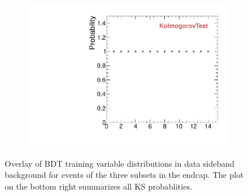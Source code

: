 \begin{figure}
\begin{subfigure}[b]{0.2\textwidth}
                \includegraphics[width=\textwidth]{Figures/VariablesComparison/Data_endcaps_figs_3h/KS}
                \label{fig:Data_endcaps_KS_3h}
        \end{subfigure}
        \caption{Overlay of BDT training variable distributions in data sideband background for events of the three subsets in the endcap. The plot on the bottom right summarizes all KS probablities.}
        \label{fig:Data_endcaps_figs_3h}
\end{figure}


